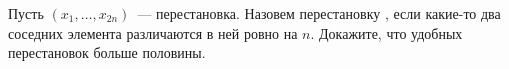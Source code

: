 Пусть $(x_1, \dots, x_{2n})$~--- перестановка. Назовем перестановку , если какие-то два
соседних элемента различаются в ней ровно на $n$. Докажите, что удобных перестановок больше половины.